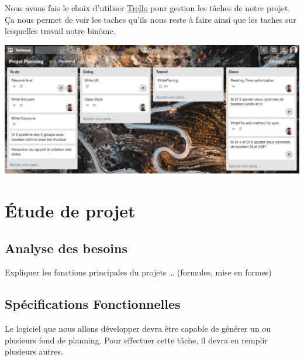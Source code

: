 \documentclass{polytech/polytech}
\begin{document}
	Nous avons fais le choix d'utiliser \href{https://trello.com/}{Trello} pour gestion les tâches de notre projet.
	Ça nous permet de voir les taches qu'ils nous reste à faire ainsi que les taches sur lesquelles travail notre binôme.

	\includegraphics[width=\textwidth]{./img/trello.png}

	\chapter{Étude de projet}
	\section{Analyse des besoins}

	Expliquer les fonctions principales du projets … (formules, mise en formes)

	\section{Spécifications Fonctionnelles}
	
	Le logiciel que nous allons développer devra être capable de générer un ou plusieurs fond de planning. Pour effectuer cette tâche, il devra en remplir plusieurs autres.
	
\end{document}
